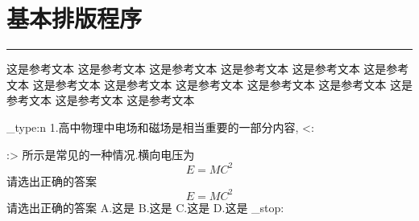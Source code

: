 \documentclass[a4paper,fontset = windowsnew]{ctexbook}
\begin{document}
\chapter{基本排版程序}

\ExplSyntaxOn

\parindent=0pt


\rule{\linewidth}{1pt}\newline
这是参考文本
这是参考文本
这是参考文本
这是参考文本
这是参考文本
这是参考文本
这是参考文本
这是参考文本
这是参考文本
这是参考文本
这是参考文本
这是参考文本
这是参考文本
这是参考文本
\par
\selection_type:n 
1.高中物理中电场和磁场是相当重要的一部分内容,
<:
:>
所示是常见的一种情况.横向电压为
\begin{equation}
  E=MC^2
\end{equation}
请选出正确的答案
\begin{equation}
  E=MC^2
\end{equation}
请选出正确的答案
A.这是
B.这是
C.这是
D.这是
\scan_stop:
\end{document}
